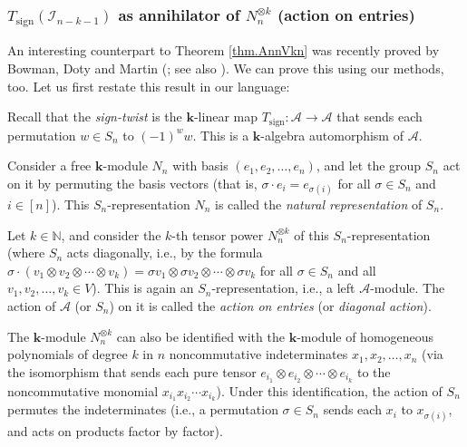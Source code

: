 \documentclass[numbers=enddot,12pt,final,onecolumn,notitlepage]{scrartcl}%
\numberwithin{exer}{subsection}
\theoremstyle{definition}
\begin{document}
\subsubsection{$T_{\operatorname*{sign}}\left(  \mathcal{I}_{n-k-1}\right)  $
as annihilator of $N_{n}^{\otimes k}$ (action on entries)}

An interesting counterpart to Theorem \ref{thm.AnnVkn} was recently proved by
Bowman, Doty and Martin (\cite[Theorem 7.4 (a)]{BoDoMa18}; see also
\cite[Example 2.13]{Donkin24}). We can prove this using our methods, too. Let
us first restate this result in our language:

Recall that the \emph{sign-twist} is the $\mathbf{k}$-linear map
$T_{\operatorname*{sign}}:\mathcal{A}\rightarrow\mathcal{A}$ that sends each
permutation $w\in S_{n}$ to $\left(  -1\right)  ^{w}w$. This is a $\mathbf{k}%
$-algebra automorphism of $\mathcal{A}$.

Consider a free $\mathbf{k}$-module $N_{n}$ with basis $\left(  e_{1}%
,e_{2},\ldots,e_{n}\right)  $, and let the group $S_{n}$ act on it by
permuting the basis vectors (that is, $\sigma\cdot e_{i}=e_{\sigma\left(
i\right)  }$ for all $\sigma\in S_{n}$ and $i\in\left[  n\right]  $). This
$S_{n}$-representation $N_{n}$ is called the \emph{natural representation} of
$S_{n}$.

Let $k\in\mathbb{N}$, and consider the $k$-th tensor power $N_{n}^{\otimes k}$
of this $S_{n}$-representation (where $S_{n}$ acts diagonally, i.e., by the
formula $\sigma\cdot\left(  v_{1}\otimes v_{2}\otimes\cdots\otimes
v_{k}\right)  =\sigma v_{1}\otimes\sigma v_{2}\otimes\cdots\otimes\sigma
v_{k}$ for all $\sigma\in S_{n}$ and all $v_{1},v_{2},\ldots,v_{k}\in V$).
This is again an $S_{n}$-representation, i.e., a left $\mathcal{A}$-module.
The action of $\mathcal{A}$ (or $S_{n}$) on it is called the \emph{action on
entries} (or \emph{diagonal action}).

The $\mathbf{k}$-module $N_{n}^{\otimes k}$ can also be identified with the
$\mathbf{k}$-module of homogeneous polynomials of degree $k$ in $n$
noncommutative indeterminates $x_{1},x_{2},\ldots,x_{n}$ (via the isomorphism
that sends each pure tensor $e_{i_{1}}\otimes e_{i_{2}}\otimes\cdots\otimes
e_{i_{k}}$ to the noncommutative monomial $x_{i_{1}}x_{i_{2}}\cdots x_{i_{k}}%
$). Under this identification, the action of $S_{n}$ permutes the
indeterminates (i.e., a permutation $\sigma\in S_{n}$ sends each $x_{i}$ to
$x_{\sigma\left(  i\right)  }$, and acts on products factor by factor).
\end{document}
